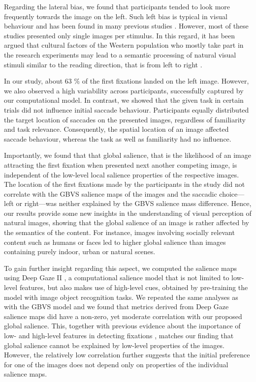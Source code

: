 {Regarding the lateral bias, we found that participants tended to look more frequently towards the image on the left. Such left bias is typical in visual behaviour and has been found in many previous studies \citep{barton2006leftbias, guo2009leftbias, calenwalshe2014assymetricfixation, ossandon2014spatialbiases}. However, most of these studies presented only single images per stimulus. In this regard, it has been argued that cultural factors of the Western population who mostly take part in the research experiments may lead to a semantic processing of natural visual stimuli similar to the reading direction, that is from left to right \citep{spalek2005leftbias, zaeinab2016leftbias}.

In our study, about 63 \% of the first fixations landed on the left image. However, we also observed a high variability across participants, successfully captured by our computational model. In contrast, we showed that the given task in certain trials did not influence initial saccade behaviour. Participants equally distributed the target location of saccades on the presented images, regardless of familiarity and task relevance. Consequently, the spatial location of an image affected saccade behaviour, whereas the task as well as familiarity had no influence.

Importantly, we found that that global salience, that is the likelihood of an image attracting the first fixation when presented next another competing image, is independent of the low-level local salience properties of the respective images. The location of the first fixations made by the participants in the study did not correlate with the GBVS salience maps of the images and the saccadic choice---left or right---was neither explained by the GBVS salience mass difference. Hence, our results provide some new insights in the understanding of visual perception of natural images, showing that the global salience of an image is rather affected by the semantics of the content. For instance, images involving socially relevant content such as humans or faces led to higher global salience than images containing purely indoor, urban or natural scenes.

To gain further insight regarding this aspect, we computed the salience maps using Deep Gaze II \citep{kuemmerer2016deepgaze}, a computational salience model that is not limited to low-level features, but also makes use of high-level cues, obtained by pre-training the model with image object recognition tasks. We repeated the same analyses as with the GBVS model and we found that metrics derived from Deep Gaze salience maps did have a non-zero, yet moderate correlation with our proposed global salience. This, together with previous evidence about the importance of low- and high-level features in detecting fixations \citep{kuemmerer2017icfdeepgaze}, matches our finding that global salience cannot be explained by low-level properties of the images. However, the relatively low correlation further suggests that the initial preference for one of the images does not depend only on properties of the individual salience maps.

}

